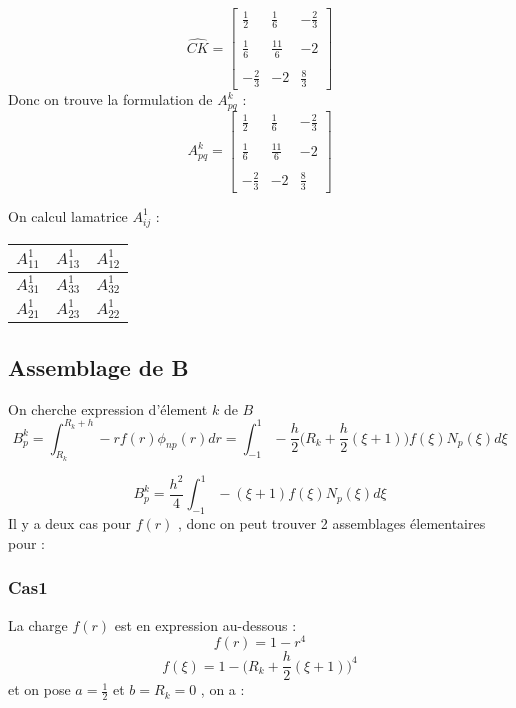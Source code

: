 \documentclass[a4paper,10pt]{report} %
\begin{document}
\[ \widehat{CK}=\left[ \begin{array}{ccc}
\frac{1}{2} & \frac{1}{6} & -\frac{2}{3} \\\\
\frac{1}{6} & \frac{11}{6} & -2 \\\\
-\frac{2}{3} & -2 & \frac{8}{3} \end{array} \right]\]
 Donc on trouve la formulation de $A_{pq}^k$ :
$$A_{pq}^k=
\left[ \begin{array}{ccc}
\frac{1}{2} & \frac{1}{6} & -\frac{2}{3} \\\\
\frac{1}{6} & \frac{11}{6} & -2 \\\\
-\frac{2}{3} & -2 & \frac{8}{3} \end{array} \right]$$
 
 On calcul lamatrice $A_{ij}^1$ :
\begin{center}
\begin{tabular}{ |l | c | r | }
     \hline
     $A_{11}^1$ &  $A_{13}^1$ &  $A_{12}^1$ \\
     \hline
      $A_{31}^1$ &  $A_{33}^1$ &  $A_{32}^1$ \\
     \hline
     $A_{21}^1$ &  $A_{23}^1$ &  $A_{22}^1$ \\
     \hline
\end{tabular}
\end{center}


\subsection{Assemblage de B}

On cherche expression d'élement $k$ de $B$
\begin{equation}
B_p^k=\int_{R_k}^{R_k+h}-rf(r)\phi_{np}(r) dr=\int_{-1}^{1}-\frac{h}{2}\Big(R_k+\frac{h}{2}(\xi+1)\Big)f(\xi)N_p(\xi) d\xi
\end{equation}

\begin{equation}
B_p^k=\frac{h^2}{4}\int_{-1}^{1}-(\xi+1)f(\xi)N_p(\xi) d\xi
\end{equation}
 Il y a deux cas pour $f(r)$ , donc on peut trouver 2 assemblages élementaires pour :
 \subsubsection{Cas1}
 La charge $f(r)$ est en expression au-dessous :
 \begin{equation}
 f(r)=1-r^4
 \end{equation}
  \begin{equation}
 f(\xi)=1-\Big(R_k+\frac{h}{2}(\xi+1)\Big)^4
 \end{equation}
 et on pose $a=\frac{1}{2}$ et $b=R_k=0$ , on a :\\
 
\end{document}

